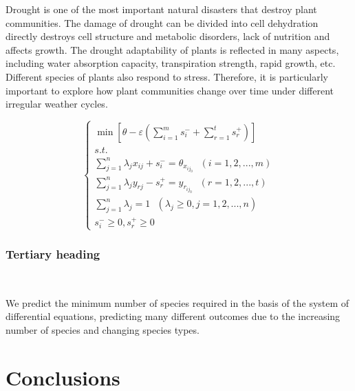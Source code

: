 \documentclass[12pt]{article}
\begin{document}
Drought is one of the most important natural disasters that destroy plant communities. The damage of drought can be divided into cell dehydration directly destroys cell structure and metabolic disorders, lack of nutrition and affects growth. The drought adaptability of plants is reflected in many aspects, including water absorption capacity, transpiration strength, rapid growth, etc. Different species of plants also respond to stress. Therefore, it is particularly important to explore how plant communities change over time under different irregular weather cycles.
\begin{large}
\begin{equation}
\begin{cases}
    \min[\theta-\varepsilon(\sum\limits_{i=1}^{m}s_{i}^{-}+\sum\limits_{r=1}^{t}s_{r}^{+})]
    \\
    s.t.
    \\
    \sum\limits_{j=1}^{n}\lambda_jx_{ij}+s_{i}^{-}=\theta_{x_{ij_0}}\ \ \ (i=1,2,...,m)
    \\
    \sum\limits_{j=1}^{n}\lambda_jy_{rj}-s_{r}^{+}=y_{r_{ij_0}}\ \ \ (r=1,2,...,t)
    \\
    \sum\limits_{j=1}^{n}\lambda_j=1\ \ \ (\lambda_j\geqslant0,j=1,2,...,n)
    \\
    s_{i}^{-}\geqslant0,s_{r}^{+}\geqslant0
\end{cases}
\end{equation}
\end{large}

\subsubsection{Tertiary heading}
\

We predict the minimum number of species required in the basis of the system of differential equations, predicting many different outcomes due to the increasing number of species and changing species types.








\section{Conclusions}
\
\end{document}
